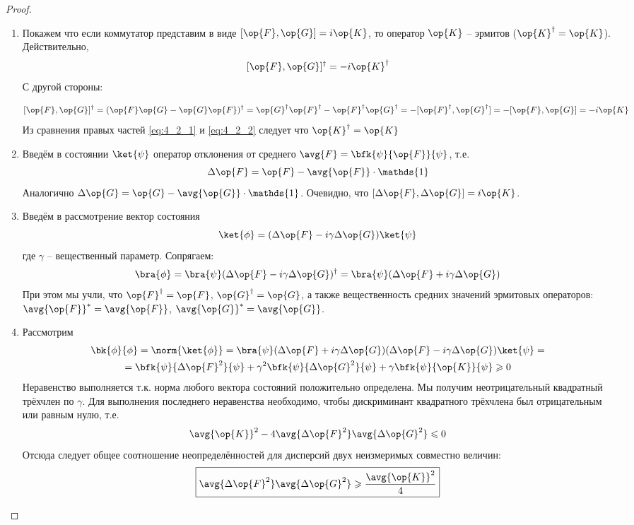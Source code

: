 \begin{proof}
\begin{enumerate}
\item Покажем что если коммутатор представим в виде $[\op{F},\op{G}]=i\op{K}$, то оператор $\op{K}$ -- эрмитов ($\op{K}^\dag=\op{K}$). Действительно,
\begin{equation}
  \label{eq:4_2_1}
  [\op{F},\op{G}]^\dag=-i\op{K}^\dag
\end{equation}%
%
С другой стороны:

\begin{equation}
  \label{eq:4_2_2}
  [\op{F},\op{G}]^\dag= (\op{F}\op{G} - \op{G}\op{F})^\dag =
    \op{G}^\dag \op{F}^\dag - \op{F}^\dag \op{G}^\dag =
    -[\op{F}^\dag,\op{G}^\dag]= -[\op{F},\op{G}]= -i\op{K}
\end{equation}%
%
Из сравнения правых частей \eqref{eq:4_2_1} и \eqref{eq:4_2_2} следует что $\op{K}^\dag=\op{K}$

\item Введём в состоянии $\ket{\psi}$ оператор отклонения от среднего $\avg{F}=\bfk{\psi}{\op{F}}{\psi}$, т.е.
%
$$
  \Delta\op{F}=\op{F}-\avg{\op{F}}\cdot\mathds{1}
$$%
%
Аналогично $\Delta\op{G} = \op{G} - \avg{\op{G}} \cdot \mathds{1}$. Очевидно, что $[\Delta\op{F}, \Delta\op{G}] = i\op{K}$.

\item Введём в рассмотрение вектор состояния
$$
  \ket{\phi}=(\Delta\op{F}-i\gamma\Delta\op{G})\ket{\psi}
$$%
%
где $\gamma$ -- вещественный параметр. Сопрягаем:
$$
  \bra{\phi} = \bra{\psi} (\Delta\op{F} - i\gamma\Delta\op{G})^\dag =
    \bra{\psi} (\Delta\op{F} + i\gamma\Delta\op{G})
$$%
%
При этом мы учли, что $\op{F}^\dag = \op{F}$, $\op{G}^\dag = \op{G}$, а также вещественность средних значений эрмитовых операторов: $\avg{\op{F}}^* = \avg{\op{F}}$, $\avg{\op{G}}^* = \avg{\op{G}}$.

\item Рассмотрим
$$
\begin{gathered}
  \bk{\phi}{\phi} = \norm{\ket{\phi}} =
    \bra{\psi}(\Delta\op{F} + i\gamma\Delta\op{G})
        (\Delta\op{F} - i\gamma\Delta\op{G})\ket{\psi} = \\ =
    \bfk{\psi}{\Delta\op{F}^2}{\psi} + \gamma^2\bfk{\psi}{\Delta\op{G}^2}{\psi} +
      \gamma\bfk{\psi}{\op{K}}{\psi} \geqslant 0
\end{gathered}
$$%
%
Неравенство выполняется т.к. норма любого вектора состояний положительно определена. Мы получим неотрицательный квадратный трёхчлен по $\gamma$. Для выполнения последнего неравенства необходимо, чтобы дискриминант квадратного трёхчлена был отрицательным или равным нулю, т.е.
$$
  \avg{\op{K}}^2 - 4 \avg{\Delta\op{F}^2} \avg{\Delta\op{G}^2} \leqslant 0
$$%
%
Отсюда следует общее соотношение неопределённостей для дисперсий двух неизмеримых совместно величин:
$$
  \boxed{
    \avg{\Delta\op{F}^2} \avg{\Delta\op{G}^2} \geqslant \frac{\avg{\op{K}}^2}{4}
  }
$$


\end{enumerate}
\end{proof}
